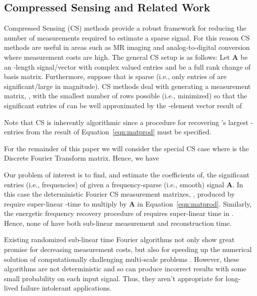 \documentclass{article}
\begin{document}
\subsection{Compressed Sensing and Related Work}

Compressed Sensing (CS) methods \cite{CS1,CS2,CMDetCS3,CMDetCS1,CMDetCS2} provide a robust framework for reducing the number of measurements required to estimate a sparse signal.  For this reason CS methods are useful in areas such as MR imaging \cite{MRI1, MRI2} and analog-to-digital conversion \cite{SigApp1,SigApp2} where measurement costs are high.  The general CS setup is as follows:  Let \textbf{A} be an -length signal/vector with complex valued entries and  be a full rank  change of basis matrix.  Furthermore, suppose that  is sparse (i.e., only  entries of  are significant/large in magnitude).  CS methods deal with generating a  measurement matrix, , with the smallest number of rows possible (i.e.,  minimized) so that the  significant entries of  can be well approximated by the -element vector result of

Note that CS is inherently algorithmic since a procedure for recovering 's largest -entries from the result of Equation~\ref{eqn:matprod} must be specified.  

For the remainder of this paper we will consider the special CS case where  is the  Discrete Fourier Transform matrix.  Hence, we have

Our problem of interest is to find, and estimate the coefficients of, the  significant entries (i.e., frequencies) of  given a frequency-sparse (i.e., smooth) signal \textbf{A}.  In this case the deterministic Fourier CS measurement matrixes, , produced by \cite{CS2,CMDetCS3,CMDetCS1,CMDetCS2} require super-linear -time to multiply by \textbf{A} in Equation~\ref{eqn:matprod}.  Similarly, the energetic frequency recovery procedure of \cite{CS1,DetCS} requires super-linear time in .  Hence, none of \cite{CS1,CS2,DetCS,CMDetCS3,CMDetCS1,CMDetCS2} have both sub-linear measurement and reconstruction time.  

Existing randomized sub-linear time Fourier algorithms \cite{AAFFT1,AAFFT1exp,AAFFT2} not only show great promise for decreasing measurement costs, but also for speeding up the numerical solution of computationally challenging multi-scale problems \cite{SparseSpect, SparseSpectM}.  However, these algorithms are not deterministic and so can produce incorrect results with some small probability on each input signal.  Thus, they aren't appropriate for long-lived failure intolerant applications.
\end{document}
